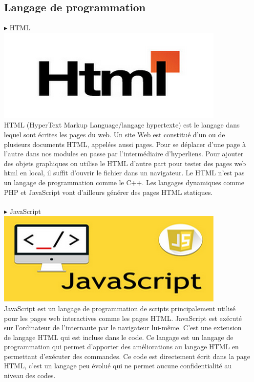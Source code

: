 \documentclass[a4paper, 12pt]{report}
\begin{document}
\subsection{Langage de programmation}
\noindent $\blacktriangleright$ HTML
\\
\includegraphics{img/outils/2}
\\
\noindent HTML (HyperText Markup Language/langage hypertexte) est le langage dans lequel sont écrites les pages du web. Un site Web est constitué d’un ou de plusieurs documents HTML, appelées aussi pages. Pour se déplacer d’une page à l’autre dans nos modules en passe par l’intermédiaire d’hyperliens. Pour ajouter des objets graphiques on utilise le HTML d’autre part pour tester des pages web html en local, il suffit d’ouvrir le fichier dans un navigateur. Le HTML n’est pas un langage de programmation comme le C++. Les langages dynamiques comme PHP et JavaScript vont d’ailleurs générer des pages HTML statiques.
\\
\\
\noindent $\blacktriangleright$ JavaScript
\\
\includegraphics{img/outils/3}
\\
\noindent JavaScript est un langage de programmation de scripts principalement utilisé pour les pages web interactives comme les pages HTML. JavaScript est exécuté sur l’ordinateur de l’internaute par le navigateur lui-même. C’est une extension de langage HTML qui est incluse dans le code. Ce langage est un langage de programmation qui permet d’apporter des améliorations au langage HTML en permettant d’exécuter des commandes. Ce code est directement écrit dans la page HTML, c’est un langage peu évolué qui ne permet aucune confidentialité au niveau des codes.
\end{document}
